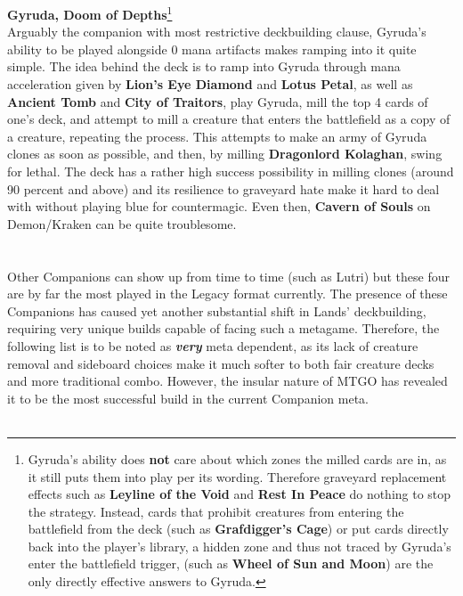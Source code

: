 \documentclass{report}
\begin{document}
\textbf{Gyruda, Doom of Depths}\footnote{Gyruda's ability does \textbf{not} care about which zones the milled cards are in, as it still puts them into play per its wording. Therefore graveyard replacement effects such as \textbf{Leyline of the Void} and \textbf{Rest In Peace} do nothing to stop the strategy. Instead, cards that prohibit creatures from entering the battlefield from the deck (such as \textbf{Grafdigger's Cage}) or put cards directly back into the player's library, a hidden zone and thus not traced by Gyruda's enter the battlefield trigger, (such as \textbf{Wheel of Sun and Moon}) are the only directly effective answers to Gyruda.}\\
Arguably the companion with most restrictive deckbuilding clause, Gyruda's ability to be played alongside 0 mana artifacts makes ramping into it quite simple. The idea behind the deck is to ramp into Gyruda through mana acceleration given by \textbf{Lion's Eye Diamond} and \textbf{Lotus Petal}, as well as \textbf{Ancient Tomb} and \textbf{City of Traitors}, play Gyruda, mill the top 4 cards of one's deck, and attempt to mill a creature that enters the battlefield as a copy of a creature, repeating the process. This attempts to make an army of Gyruda clones as soon as possible, and then, by milling \textbf{Dragonlord Kolaghan}, swing for lethal. The deck has a rather high success possibility in milling clones (around 90 percent and above) and its resilience to graveyard hate make it hard to deal with without playing blue for countermagic. Even then, \textbf{Cavern of Souls} on Demon/Kraken can be quite troublesome.\\
\\\\
Other Companions can show up from time to time (such as Lutri) but these four are by far the most played in the Legacy format currently. The presence of these Companions has caused yet another substantial shift in Lands' deckbuilding, requiring very unique builds capable of facing such a metagame. Therefore, the following list is to be noted as \textit{\textbf{very}} meta dependent, as its lack of creature removal and sideboard choices make it much softer to both fair creature decks and more traditional combo. However, the insular nature of MTGO has revealed it to be the most successful build in the current Companion meta.\\\\
\end{document}
